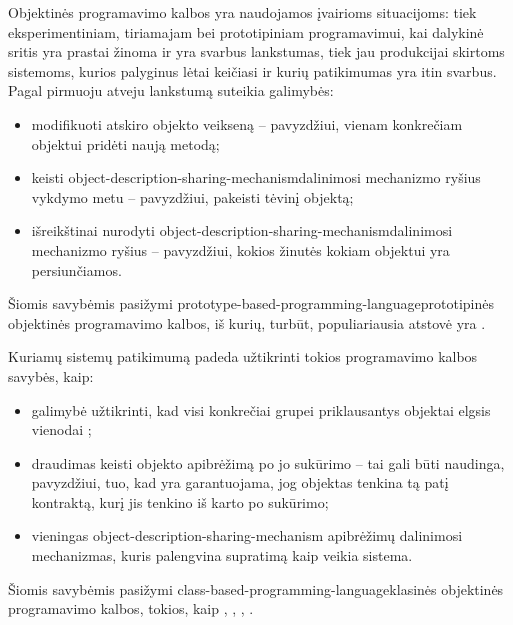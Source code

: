 Objektinės programavimo kalbos yra naudojamos įvairioms situacijoms:
tiek eksperimentiniam, tiriamajam bei prototipiniam programavimui, kai
dalykinė sritis yra prastai žinoma ir yra svarbus lankstumas, tiek
jau produkcijai skirtoms sistemoms, kurios palyginus
lėtai keičiasi ir kurių patikimumas yra itin
svarbus\cite{Lieberman:1987:TO:62139.62144}. Pagal \cite{Lieberman:1987:TO:62139.62144} pirmuoju
atveju lankstumą suteikia galimybės:
\begin{itemize}
  \item modifikuoti atskiro objekto veikseną – pavyzdžiui, vienam
    konkrečiam objektui pridėti naują metodą;
  \item keisti \gls{object-description-sharing-mechanism}{dalinimosi
    mechanizmo} ryšius vykdymo metu – pavyzdžiui, pakeisti tėvinį
    objektą;
  \item išreikštinai nurodyti
    \gls{object-description-sharing-mechanism}{dalinimosi mechanizmo}
    ryšius – pavyzdžiui, kokios žinutės kokiam objektui yra
    persiunčiamos.
\end{itemize}
Šiomis savybėmis pasižymi
\gls{prototype-based-programming-language}{prototipinės objektinės
programavimo kalbos}, iš kurių, turbūt, populiariausia atstovė yra
.

Kuriamų sistemų patikimumą padeda užtikrinti tokios programavimo
kalbos savybės, kaip:
\begin{itemize}
  \item galimybė užtikrinti, kad visi konkrečiai grupei priklausantys
    objektai elgsis vienodai ;
  \item draudimas keisti objekto apibrėžimą po jo sukūrimo – tai
    gali būti naudinga, pavyzdžiui, tuo, kad yra garantuojama,
    jog objektas tenkina tą patį kontraktą, kurį jis tenkino iš
    karto po sukūrimo;
  \item vieningas \gls{object-description-sharing-mechanism}{
    apibrėžimų dalinimosi mechanizmas}, kuris palengvina supratimą
    kaip veikia sistema.
\end{itemize}
Šiomis savybėmis pasižymi
\gls{class-based-programming-language}{klasinės objektinės
programavimo kalbos}, tokios, kaip , ,
, .

